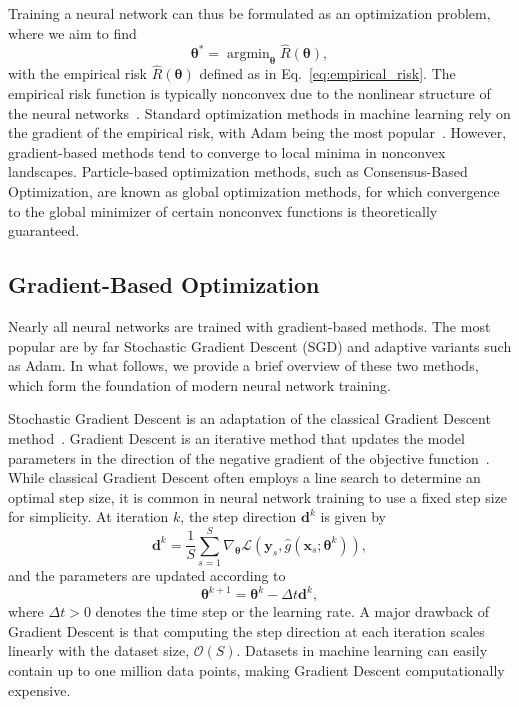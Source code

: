 \documentclass[a4paper, 11pt]{article}
\newcommand{\btheta}{\bm{\theta}}
\DeclareMathOperator*{\argmin}{argmin}
\theoremstyle{plain} %
\begin{document}
	Training a neural network can thus be formulated as an optimization problem, where we aim to find
	\begin{equation}
		\btheta^* = \argmin_{\btheta} \hat{R}\left( \btheta \right), 
	\end{equation}
	with the empirical risk $ \hat{R}\left( \btheta \right)  $ defined as in Eq.~\eqref{eq:empirical_risk}. The empirical risk function is typically nonconvex due to the nonlinear structure of the neural networks~\cite{goodfellowDeepLearning2016}. Standard optimization methods in machine learning rely on the gradient of the empirical risk, with Adam being the most popular~\cite{kingma2015adam}. However, gradient-based methods tend to converge to local minima in nonconvex landscapes. Particle-based optimization methods, such as Consensus-Based Optimization, are known as global optimization methods, for which convergence to the global minimizer of certain nonconvex functions is theoretically guaranteed.
	
	\subsection{Gradient-Based Optimization}\label{gradient_based_opt}
	Nearly all neural networks are trained with  gradient-based methods. The most popular are by far Stochastic Gradient Descent (SGD) and adaptive variants such as Adam. In what follows, we provide a brief overview of these two methods, which form the foundation of modern neural network training.

	Stochastic Gradient Descent is an adaptation of the classical Gradient Descent method~\cite{goodfellowDeepLearning2016}. Gradient Descent is an iterative method that updates the model parameters in the direction of the negative gradient of the objective function~\cite{NocedalNumericalOptimization}. While classical Gradient Descent often employs a line search to determine an optimal step size, it is common in neural network training to use a fixed step size for simplicity. At iteration $ k $, the step direction $ \bm{d}^{k} $ is given by
	\begin{equation}\label{eq:gradient_descent}
		\bm{d}^{k} = \frac{1}{S}\sum_{s=1}^{S} \nabla_{\btheta} \mathcal{L}\left(\bm{y}_{s}, \hat{g}(\bm{x}_{s};\btheta^{k}) \right),
	\end{equation} 
	and the parameters are updated according to
	\begin{equation}\label{eq:optimization_method}
		\btheta^{k+1} =  \btheta^k - \Delta t \bm{d}^{k},
	\end{equation}
	where $ \Delta t > 0 $ denotes the time step or the learning rate. A major drawback of Gradient Descent is that computing the step direction at each iteration scales linearly with the dataset size, $\mathcal{O}(S)$. Datasets in machine learning can easily contain up to one million data points, making Gradient Descent computationally expensive. 
	
\end{document}
